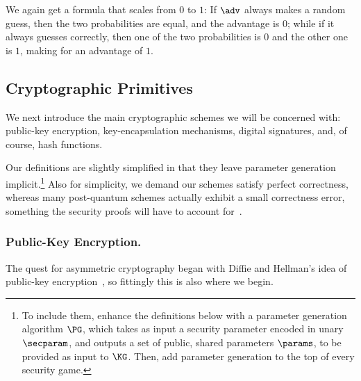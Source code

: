       \noindent
      We again get a formula that scales from $0$ to $1$: If $\adv$ always
        makes a random guess, then the two probabilities are equal, and the advantage is $0$;
        while if it always guesses correctly, then one of the two probabilities is
        $0$ and the other one is $1$, making for an advantage of $1$.
      

  \subsection{Cryptographic Primitives}\label{sec:basics:primitives}
    We next introduce the main cryptographic schemes we will be concerned with:
      public-key encryption, key-encapsulation mechanisms, digital signatures,
      and, of course, hash functions. 

    Our definitions are slightly simplified in that they leave parameter
      generation implicit.\footnote{
        To include them, enhance the definitions below with a parameter
        generation algorithm $\PG$, which takes as input a security parameter
        encoded in unary $\secparam$, and outputs a set of public, shared parameters
        $\params$, to be provided as input to $\KG$. Then, add parameter
        generation to the top of every security game.
      }
      Also for simplicity, we demand our schemes satisfy perfect correctness, whereas
      many post-quantum schemes actually
      exhibit a small correctness error, something the security proofs will
      have to account for~\cite{TCC:HofHovKil17}.

    \subsubsection{Public-Key Encryption.}
      The quest for asymmetric cryptography began with Diffie and Hellman's idea
        of public-key encryption~\cite{DifHel76}, so fittingly this is also where we
        begin.

